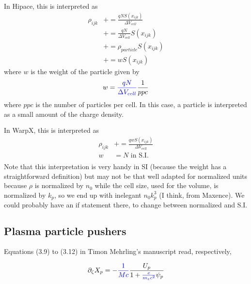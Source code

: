 \documentclass{article}
\begin{document}
In Hipace, this is interpreted as
\begin{equation}
\begin{split}
\rho_{ijk} &+= \frac{q N S(x_{ijk})}{\Delta V_{cell}} \\
           &+= \frac{q N}{\Delta V_{cell}} S(x_{ijk}) \\
           &+= \rho_{particle} S(x_{ijk}) \\
           &+= wS(x_{ijk})
\end{split}
\end{equation}
where $w$ is the weight of the particle given by
\begin{equation}
\begin{split}
w &= \textcolor{blue}{\frac{q N}{\Delta V_{cell}}}\frac{1}{ppc} \\
\end{split}
\end{equation}
where $ppc$ is the number of particles per cell. In this case, a particle is interpreted as a small amount of the charge density.

In WarpX, this is interpreted as
\begin{equation}
\begin{split}
\rho_{ijk} &+= \frac{q w S(x_{ijk})}{\Delta V_{cell}} \\
w &= N \text{ in S.I.} \\
\end{split}
\end{equation}
Note that this interpretation is very handy in SI (because the weight has a straightforward definition) but may not be that well adapted for normalized units because $\rho$ is normalized by $n_0$ while the cell size, used for the volume, is normalized by $k_p$, so we end up with inelegant $n_0k_p^3$ (I think, from Maxence). We could probably have an if statement there, to change between normalized and S.I.

\subsection*{Plasma particle pushers}

Equations (3.9) to (3.12) in Timon Mehrling's manuscript read, respectively,

\begin{equation}
\partial_{\zeta}X_p = -\textcolor{blue}{\frac{1}{Mc}}\frac{U_p} {1+\textcolor{blue}{\frac{e}{m_e c^2}}\psi_p }
\end{equation}
\end{document}

